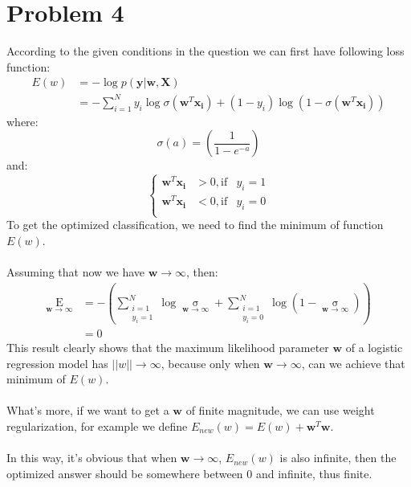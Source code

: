 \documentclass[12pt]{scrartcl}
\newcommand{\vect}[1]{\boldsymbol{#1}}
\newcommand{\ve}{\vect}
\begin{document}
  \section*{Problem 4}
  According to the given conditions in the question we can first have following loss function:
\begin{equation*}
    \begin{aligned}
    E(w) &= -\log p(\ve{y}|\ve{w},\ve{X})\\
         &= - \sum_{i=1}^N y_i \log \sigma(\ve{w}^T\ve{x_i}) + (1 - y_i)\log (1-\sigma(\ve{w}^T\ve{x_i}))
    \end{aligned}
  \end{equation*}
  where:
  \[\sigma(a)=\left(\frac{1}{1 - e^{-a}}\right)\]
  and:
\begin{equation}
\left\{
\begin{aligned}
\ve{w}^T\ve{x_i} & > 0,  \text{if} &  y_i = 1 \nonumber\\ 
\ve{w}^T\ve{x_i} & < 0,  \text{if} &  y_i = 0 \\
\end{aligned}
\right.
\end{equation}
To get the optimized classification, we need to find the minimum of function $E(w)$.
\\
\\
Assuming that now we have $\ve{w} \rightarrow \infty$, then:
\begin{equation*}
    \begin{aligned}
    \mathop{E(w)}\limits_{\ve{w} \rightarrow \infty} 
        &= - \left(  \sum_{\substack{i=1\\y_i = 1}}^N  \log \mathop{\sigma(\ve{w}^T\ve{x_i})}\limits_{\ve{w} \rightarrow \infty}  + \sum_{\substack{i=1\\y_i = 0}}^N  \log (1-\mathop{\sigma(\ve{w}^T\ve{x_i})}\limits_{\ve{w} \rightarrow \infty})  \right)\\
        &= 0
    \end{aligned}
  \end{equation*}
  This result clearly shows that the maximum likelihood parameter $\ve{w}$ of a logistic regression model has $\left| \left|w \right|\right| \rightarrow \infty$, because only when $\ve{w} \rightarrow \infty$, can we achieve that minimum of $E(w)$.
  \\
  \\
  What's more, if we want to get a $\ve{w}$ of finite magnitude, we can use weight regularization, for example we define $E_{new}(w) = E(w) + \ve{w}^T\ve{w}$.
  \\
  \\
  In this way, it's obvious that when $\ve{w} \rightarrow \infty$, $E_{new}(w)$ is also infinite, then the optimized answer should be somewhere between 0 and infinite, thus finite.
\end{document}
